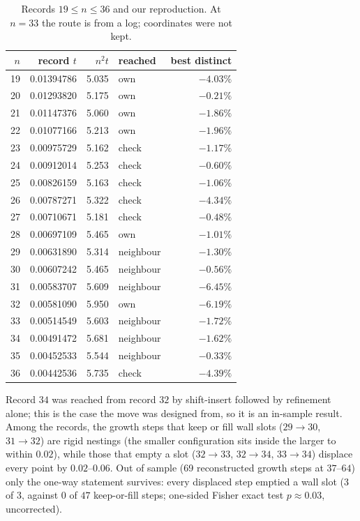 \documentclass[11pt]{amsart}
\theoremstyle{definition}
\begin{document}
\begin{table}[htbp]
\centering\small
\caption{Records $19 \le n \le 36$ \cite{Stead} and our reproduction. At $n = 33$ the route is from a log; coordinates were not kept.}\label{tab:records}
\begin{tabular}{@{}rrrlr@{}}
\toprule
$n$ & record $t$ & $n^2t$ & reached & best distinct \\
\midrule
19 & 0.01394786 & 5.035 & own & $-4.03\%$ \\
20 & 0.01293820 & 5.175 & own & $-0.21\%$ \\
21 & 0.01147376 & 5.060 & own & $-1.86\%$ \\
22 & 0.01077166 & 5.213 & own & $-1.96\%$ \\
23 & 0.00975729 & 5.162 & check & $-1.17\%$ \\
24 & 0.00912014 & 5.253 & check & $-0.60\%$ \\
25 & 0.00826159 & 5.163 & check & $-1.06\%$ \\
26 & 0.00787271 & 5.322 & check & $-4.34\%$ \\
27 & 0.00710671 & 5.181 & check & $-0.48\%$ \\
28 & 0.00697109 & 5.465 & own & $-1.01\%$ \\
29 & 0.00631890 & 5.314 & neighbour & $-1.30\%$ \\
30 & 0.00607242 & 5.465 & neighbour & $-0.56\%$ \\
31 & 0.00583707 & 5.609 & neighbour & $-6.45\%$ \\
32 & 0.00581090 & 5.950 & own & $-6.19\%$ \\
33 & 0.00514549 & 5.603 & neighbour & $-1.72\%$ \\
34 & 0.00491472 & 5.681 & neighbour & $-1.62\%$ \\
35 & 0.00452533 & 5.544 & neighbour & $-0.33\%$ \\
36 & 0.00442536 & 5.735 & check & $-4.39\%$ \\
\bottomrule
\end{tabular}
\end{table}

Record $34$ was reached from record $32$ by shift-insert followed by refinement alone; this is the case the move was designed from, so it is an in-sample result. Among the records, the growth steps that keep or fill wall slots ($29 \to 30$, $31 \to 32$) are rigid nestings (the smaller configuration sits inside the larger to within $0.02$), while those that empty a slot ($32 \to 33$, $32 \to 34$, $33 \to 34$) displace every point by $0.02$--$0.06$. Out of sample (69 reconstructed growth steps at $37$--$64$) only the one-way statement survives: every displaced step emptied a wall slot ($3$ of $3$, against $0$ of $47$ keep-or-fill steps; one-sided Fisher exact test $p \approx 0.03$, uncorrected). %
\end{document}
